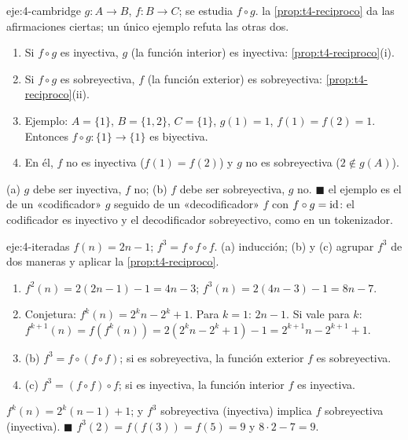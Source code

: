 \begin{solucion}{eje:4-cambridge}
\datos $g\colon A\to B$, $f\colon B\to C$; se estudia $f\circ g$.
\planteamiento la \cref{prop:t4-reciproco} da las afirmaciones ciertas; un único ejemplo refuta las otras dos.
\pasos
\begin{enumerate}[label=\arabic*.]
  \item Si $f\circ g$ es inyectiva, $g$ (la función interior) es inyectiva: \cref{prop:t4-reciproco}(i).
  \item Si $f\circ g$ es sobreyectiva, $f$ (la función exterior) es sobreyectiva: \cref{prop:t4-reciproco}(ii).
  \item Ejemplo: $A=\{1\}$, $B=\{1,2\}$, $C=\{1\}$, $g(1)=1$, $f(1)=f(2)=1$. Entonces $f\circ g\colon\{1\}\to\{1\}$ es biyectiva.
  \item En él, $f$ no es inyectiva ($f(1)=f(2)$) y $g$ no es sobreyectiva ($2\notin g(A)$).
\end{enumerate}
\resultado (a) $g$ debe ser inyectiva, $f$ no; (b) $f$ debe ser sobreyectiva, $g$ no. \hfill$\blacksquare$
\comprobacion el ejemplo es el de un «codificador» $g$ seguido de un «decodificador» $f$ con $f\circ g=\mathrm{id}$: el codificador es inyectivo y el decodificador sobreyectivo, como en un tokenizador.
\end{solucion}

\begin{solucion}{eje:4-iteradas}
\datos $f(n)=2n-1$; $f^{3}=f\circ f\circ f$.
\planteamiento (a) inducción; (b) y (c) agrupar $f^{3}$ de dos maneras y aplicar la \cref{prop:t4-reciproco}.
\pasos
\begin{enumerate}[label=\arabic*.]
  \item $f^{2}(n)=2(2n-1)-1=4n-3$; $f^{3}(n)=2(4n-3)-1=8n-7$.
  \item Conjetura: $f^{k}(n)=2^{k}n-2^{k}+1$. Para $k=1$: $2n-1$. Si vale para $k$: $f^{k+1}(n)=f(f^{k}(n))=2(2^{k}n-2^{k}+1)-1=2^{k+1}n-2^{k+1}+1$.
  \item (b) $f^{3}=f\circ(f\circ f)$; si es sobreyectiva, la función exterior $f$ es sobreyectiva.
  \item (c) $f^{3}=(f\circ f)\circ f$; si es inyectiva, la función interior $f$ es inyectiva.
\end{enumerate}
\resultado $f^{k}(n)=2^{k}(n-1)+1$; y $f^{3}$ sobreyectiva (inyectiva) implica $f$ sobreyectiva (inyectiva). \hfill$\blacksquare$
\comprobacion $f^{3}(2)=f(f(3))=f(5)=9$ y $8\cdot2-7=9$.
\end{solucion}

